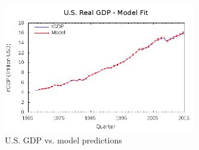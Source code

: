     \begin{figure}
        \begin{center}
        \includegraphics[width=0.75\textwidth]{../img/model1-rgdp-fit.png}
        \end{center}
        \caption{U.S. GDP vs. model predictions}
        \label{fig:fitoverlay}
    \end{figure}
    
